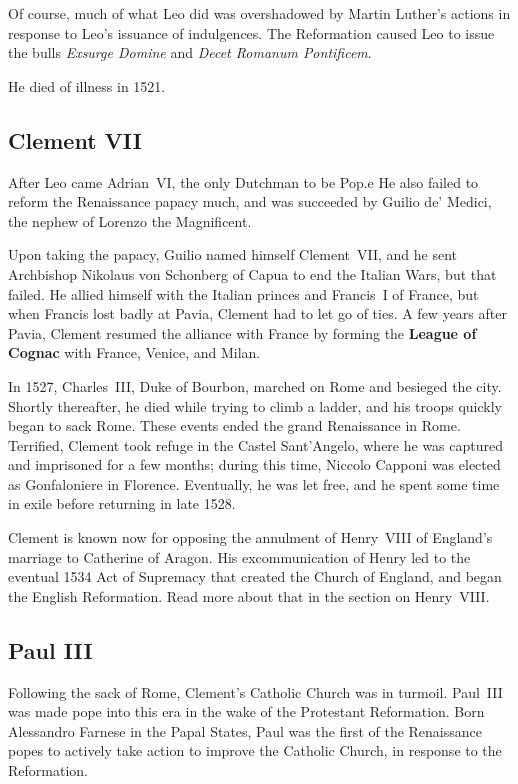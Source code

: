 Of course, much of what Leo did was overshadowed by Martin Luther's actions
in response to Leo's issuance of indulgences.
The Reformation caused Leo to issue
the bulls \textit{Exsurge Domine} and \textit{Decet Romanum Pontificem}.

He died of illness in 1521.

\subsection*{Clement VII}

After Leo came Adrian~VI, the only Dutchman to be Pop.e
He also failed to reform the Renaissance papacy much,
and was succeeded by Guilio de' Medici,
the nephew of Lorenzo the Magnificent.

Upon taking the papacy, Guilio named himself Clement~VII,
and he sent Archbishop Nikolaus von Schonberg of Capua to end the Italian Wars, but that failed.
He allied himself with the Italian princes and Francis~I of France,
but when Francis lost badly at Pavia, Clement had to let go of ties.
A few years after Pavia, Clement resumed the alliance with France
by forming the \textbf{League of Cognac} with France, Venice, and Milan.

In 1527, Charles~III, Duke of Bourbon, marched on Rome and besieged the city.
Shortly thereafter, he died while trying to climb a ladder,
and his troops quickly began to sack Rome.
These events ended the grand Renaissance in Rome.
Terrified, Clement took refuge in the Castel Sant'Angelo,
where he was captured and imprisoned for a few months;
during this time, Niccolo Capponi was elected as Gonfaloniere in Florence.
Eventually, he was let free, and he spent some time in exile before returning in late 1528.

Clement is known now for opposing the annulment of Henry~VIII of England's marriage
to Catherine of Aragon.
His excommunication of Henry led to the eventual 1534 Act of Supremacy
that created the Church of England,
and began the English Reformation.
Read more about that in the section on Henry~VIII.

\subsection*{Paul III}

Following the sack of Rome, Clement's Catholic Church was in turmoil.
Paul~III was made pope into this era in the wake of the Protestant Reformation.
Born Alessandro Farnese in the Papal States,
Paul was the first of the Renaissance popes to actively take action to improve the Catholic Church,
in response to the Reformation.

